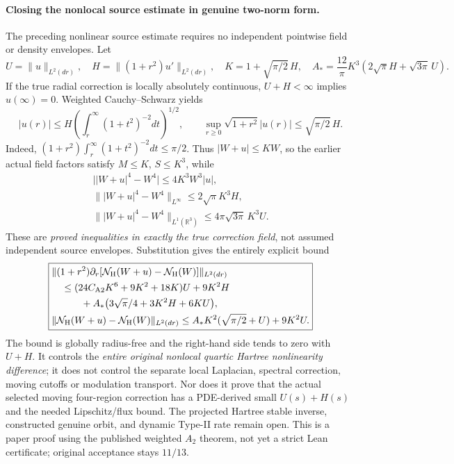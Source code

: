 \documentclass[11pt]{amsart}
\begin{document}
\paragraph{Closing the nonlocal source estimate in genuine two-norm form.}
The preceding nonlinear source estimate requires no independent
pointwise field or density envelopes. Let
\[
 U=\|u\|_{L^2(dr)},\quad
 H=\|(1+r^2)u'\|_{L^2(dr)},\quad
 K=1+\sqrt{\pi/2}\,H,\quad
 A_*=\frac{12}{\pi}K^3(2\sqrt\pi H+\sqrt{3\pi}\,U).
\]
If the true radial correction is locally absolutely continuous,
\(U+H<\infty\) implies \(u(\infty)=0\).
Weighted Cauchy--Schwarz yields
\[
 |u(r)|\le H\left(\int_r^\infty
        (1+t^2)^{-2}dt\right)^{1/2},\qquad
 \sup_{r\ge0}\sqrt{1+r^2}|u(r)|
 \le\sqrt{\pi/2}\,H.
\]
Indeed,
\((1+r^2)\int_r^\infty(1+t^2)^{-2}dt
\le\pi/2\). Thus \(|W+u|\le KW\),
so the earlier actual field factors satisfy
\(M\le K\), \(S\le K^3\), while
\[
 \begin{gathered}
 \bigl||W+u|^4-W^4\bigr|\le4K^3W^3|u|,\\
 \||W+u|^4-W^4\|_{L^\infty}
  \le2\sqrt\pi K^3H,\\
 \||W+u|^4-W^4\|_{L^1(\mathbb R^3)}
  \le4\pi\sqrt{3\pi}\,K^3U .
 \end{gathered}
\]
These are \emph{proved inequalities in exactly the true
correction field}, not assumed independent source envelopes.
Substitution gives the entirely explicit bound
\[
 \boxed{\begin{aligned}
 &\|(1+r^2)\partial_r[
  \mathcal N_{\rm H}(W+u)-\mathcal N_{\rm H}(W)]
       \|_{L^2(dr)}\\
 &\quad\le
 (24C_{\rm A2}K^6+9K^2+18K)U+9K^2H\\
 &\qquad\quad+
 A_*\bigl(3\sqrt\pi/4+3K^2H+6KU\bigr),\\
 &\|\mathcal N_{\rm H}(W+u)-\mathcal N_{\rm H}(W)\|_{L^2(dr)}
 \le A_*K^2(\sqrt{\pi/2}+U)+9K^2U .
 \end{aligned}}
\]
The bound is globally radius-free and the right-hand
side tends to zero with \(U+H\).
It controls the \emph{entire original nonlocal quartic
Hartree nonlinearity difference}; it does not control
the separate local Laplacian, spectral correction,
moving cutoffs or modulation transport.
Nor does it prove that the actual selected moving
four-region correction has a PDE-derived small
\(U(s)+H(s)\) and the needed Lipschitz/flux bound.
The projected Hartree stable inverse,
constructed genuine orbit, and dynamic Type-II rate
remain open. This is a paper proof using the
published weighted \(A_2\) theorem, not yet a
strict Lean certificate; original acceptance stays \(11/13\).
\end{document}
